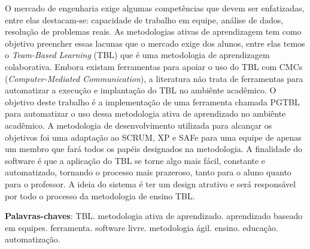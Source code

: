 \begin{resumo}
O mercado de engenharia exige algumas competências que devem ser enfatizadas, entre elas destacam-se: capacidade de trabalho em equipe, análise de dados, resolução de problemas reais. As metodologias ativas de aprendizagem tem como objetivo preencher essas lacunas que o mercado exige dos alunos, entre elas temos o \textit{Team-Based Learning} (TBL) que é uma metodologia de aprendizagem colaborativa. Embora existam ferramentas para apoiar o uso do TBL com CMCs (\textit{Computer-Mediated Communication}), a literatura não trata de ferramentas para automatizar a execução e implantação do TBL no ambiênte acadêmico. O objetivo deste trabalho é a implementação de uma ferramenta chamada PGTBL para automatizar o uso dessa metodologia ativa de aprendizado no ambiênte acadêmico. A metodologia de desenvolvimento utilizada para alcançar os objetivos foi uma adaptação ao SCRUM, XP e SAFe para uma equipe de apenas um membro que fará todos os papéis designados na metodologia. A finalidade do software é que a aplicação do TBL se torne algo mais fácil, constante e automatizado, tornando o processo mais prazeroso, tanto para o aluno quanto para o professor. A ideia do sistema é ter um design atrativo e será responsável por todo o processo da metodologia de ensino TBL.

 \vspace{\onelineskip}

 \noindent
 \textbf{Palavras-chaves}: TBL. metodologia ativa de aprendizado. aprendizado baseado em equipes. ferramenta. software
  livre. metodologia ágil. ensino. educação. automatização.
\end{resumo}
